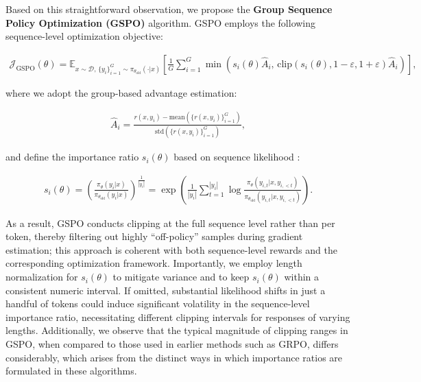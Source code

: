Based on this straightforward observation, we propose the \textbf{Group Sequence Policy Optimization (GSPO)} algorithm. GSPO employs the following sequence-level optimization objective:

\begin{align}
\mathcal{J}_\text{GSPO} (\theta) =
\mathbb{E}_{ x \sim \mathcal{D},\, \{y_i\}_{i=1}^G \sim \pi_{\theta_\text{old}}( \cdot | x) }
\left[ 
\frac{1}{G} \sum_{i=1}^{G}
\min \left( s_{i}(\theta)  \widehat{A}_{i},  \, \mathrm{clip} \left( s_{i}(\theta), 1 - {\varepsilon}, 1 + {\varepsilon} \right) \widehat{A}_{i} \right) 
\right],
\label{equ:gspo}
\end{align}

where we adopt the group-based advantage estimation:

\begin{align}
\widehat{A}_{i} = \frac{r(x, y_i) - \mathrm{mean} \left( \{ r(x, y_i) \}_{i=1}^G \right) }{ \mathrm{std} \left( \{ r(x, y_i) \}_{i=1}^G \right) },
\end{align}

and define the importance ratio $s_{i}(\theta)$ based on sequence likelihood \citep{click}:

\begin{align}
s_{i}(\theta) = \left( \frac{ \pi_{\theta} (y_i | x) }{ \pi_{\theta_\text{old}} (y_i | x)} \right)^{\frac{1}{|y_i|}}
=
\exp \left( \frac{1}{|y_i|} \sum_{t=1}^{|y_i|} \log \frac{ \pi_{\theta} (y_{i,t} | x, y_{i,<t}) }{ \pi_{\theta_\text{old}} (y_{i,t} | x,y_{i,<t})} \right).
\end{align}

As a result, GSPO conducts clipping at the full sequence level rather than per token, thereby filtering out highly ``off-policy'' samples during gradient estimation; this approach is coherent with both sequence-level rewards and the corresponding optimization framework. Importantly, we employ length normalization for $s_{i}(\theta)$ to mitigate variance and to keep $s_{i}(\theta)$ within a consistent numeric interval. If omitted, substantial likelihood shifts in just a handful of tokens could induce significant volatility in the sequence-level importance ratio, necessitating different clipping intervals for responses of varying lengths. Additionally, we observe that the typical magnitude of clipping ranges in GSPO, when compared to those used in earlier methods such as GRPO, differs considerably, which arises from the distinct ways in which importance ratios are formulated in these algorithms.

